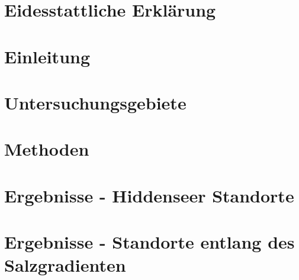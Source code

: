 \section*{Eidesstattliche Erklärung}

\clearpage

\pagestyle{scrheadings}    %
\clearscrheadfoot

\cfoot{\pagemark}
\chead{\headmark}


\tableofcontents

\newpage

\listoffigures

\listoftables

\newpage


\newpage %


\section{Einleitung}


\clearpage

\section{Untersuchungsgebiete}


\clearpage

\section{Methoden}


\clearpage

\section{Ergebnisse - Hiddenseer Standorte}


\clearpage

\section{Ergebnisse - Standorte entlang des Salzgradienten}


